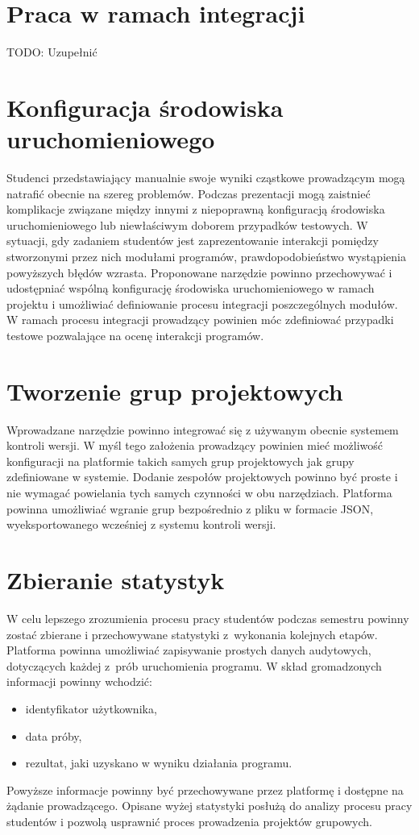 \section{Praca w ramach integracji}

TODO: Uzupełnić

\section{Konfiguracja środowiska uruchomieniowego}

Studenci przedstawiający manualnie swoje wyniki cząstkowe prowadzącym mogą natrafić obecnie na szereg problemów.
Podczas prezentacji mogą zaistnieć komplikacje związane między innymi z niepoprawną konfiguracją środowiska uruchomieniowego lub niewłaściwym doborem przypadków testowych.
W sytuacji, gdy zadaniem studentów jest zaprezentowanie interakcji pomiędzy stworzonymi
przez nich modułami programów, prawdopodobieństwo wystąpienia powyższych błędów
wzrasta.
Proponowane narzędzie powinno przechowywać i udostępniać wspólną konfigurację środowiska uruchomieniowego w ramach projektu i umożliwiać definiowanie procesu integracji poszczególnych modułów.
W ramach procesu integracji prowadzący powinien móc zdefiniować przypadki testowe pozwalające na ocenę interakcji programów.


\section{Tworzenie grup projektowych}

Wprowadzane narzędzie powinno integrować się z używanym obecnie systemem kontroli wersji.
W myśl tego założenia prowadzący powinien mieć możliwość konfiguracji na platformie takich samych grup projektowych jak grupy zdefiniowane w systemie.
Dodanie zespołów projektowych powinno być proste i nie wymagać powielania tych samych czynności w obu narzędziach.
Platforma powinna umożliwiać wgranie grup bezpośrednio z pliku w formacie JSON, wyeksportowanego wcześniej z systemu kontroli wersji.

\section{Zbieranie statystyk}

W celu lepszego zrozumienia procesu pracy studentów podczas semestru powinny zostać zbierane i przechowywane statystyki z~wykonania kolejnych etapów.
Platforma powinna umożliwiać zapisywanie prostych danych audytowych, dotyczących każdej z~prób uruchomienia programu.
W skład gromadzonych informacji powinny wchodzić:
\begin{itemize}
    \item identyfikator użytkownika,
    \item data próby,
    \item rezultat, jaki uzyskano w wyniku działania programu.
\end{itemize}
Powyższe informacje powinny być przechowywane przez platformę i dostępne na żądanie prowadzącego.
Opisane wyżej statystyki posłużą do analizy procesu pracy studentów i pozwolą usprawnić proces prowadzenia projektów grupowych.

